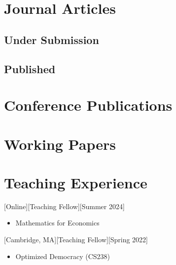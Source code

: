 \documentclass{article}
\begin{document}
	\section{Journal Articles}
	
	\renewcommand{\labelenumi}{J\theenumi.}
	
	\subsection{Under Submission}
    \vspace{-.3em}
    \begin{etaremune}
    [itemsep=0.2ex,
    	leftmargin=4.8ex]
        
    \end{etaremune}
    
	
	\subsection{Published}
	\vspace{-.3em}
	
    \begin{etaremune}
    [itemsep=0.2ex,
    	leftmargin=4.8ex, resume]
        
    \end{etaremune}
    
    
    
	

    \section{Conference Publications}
    
    \begin{etaremune}
    	[itemsep=0.2ex,
    	leftmargin=4.8ex]
    	\renewcommand{\labelenumi}{C\theenumi.}
        
    \end{etaremune}
    
    \section{Working Papers}
    \begin{etaremune}
    	[itemsep=0.2ex,
    	leftmargin=4.8ex]
    	\renewcommand{\labelenumi}{W\theenumi.}
        
    \end{etaremune}
    

    
    \section{Teaching Experience}
    [Online][Teaching Fellow][Summer 2024]
    \begin{itemize}
    	\item Mathematics for Economics
    \end{itemize}
    [Cambridge, MA][Teaching Fellow][Spring 2022]
    \begin{itemize}
        \item Optimized Democracy (CS238)
    \end{itemize}
    
\end{document}
